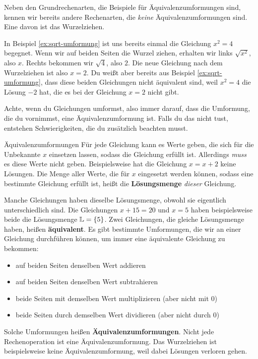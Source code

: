 \documentclass[../../main.tex]{subfiles}
\begin{document}
Neben den Grundrechenarten, die Beispiele für Äquivalenzumformungen sind, kennen wir bereits andere Rechenarten, die \emph{keine} Äquivalenzumformungen sind. Eine davon ist das Wurzelziehen.

\begin{example}{}
    In Beispiel \ref{ex:sqrt-umformung} ist uns bereits einmal die Gleichung $x^2=4$ begegnet. Wenn wir auf beiden Seiten die Wurzel ziehen, erhalten wir links $\sqrt{x^2}$, also $x$. Rechts bekommen wir $\sqrt{4}$, also $2$. Die neue Gleichung nach dem Wurzelziehen ist also $x=2$. Du weißt aber bereits aus Beispiel \ref{ex:sqrt-umformung}, dass diese beiden Gleichungen nicht äquivalent sind, weil $x^2=4$ die Lösung $-2$ hat, die es bei der Gleichung $x=2$ nicht gibt.
\end{example}

Achte, wenn du Gleichungen umformst, also immer darauf, dass die Umformung, die du vornimmst, eine Äquivalenzumformung ist. Falls du das nicht tust, entstehen Schwierigkeiten, die du zusätzlich beachten musst.

\begin{nutshell}{Äquivalenzumformungen}
    Für jede Gleichung kann es Werte geben, die sich für die Unbekannte $x$ einsetzen lassen, sodass die Gleichung erfüllt ist. Allerdings \emph{muss} es diese Werte nicht geben. Beispielsweise hat die Gleichung $x=x+2$ keine Lösungen. Die Menge aller Werte, die für $x$ eingesetzt werden können, sodass eine bestimmte Gleichung erfüllt ist, heißt die \textbf{Lösungsmenge} \Solutions \emph{dieser} Gleichung.
    
    Manche Gleichungen haben dieselbe Lösungsmenge, obwohl sie eigentlich unterschiedlich sind. Die Gleichungen $x+15=20$ und $x=5$ haben beispielsweise beide die Lösungsmenge $\mathbb{L}=\{5\}$. Zwei Gleichungen, die gleiche Lösungsmenge haben, heißen \textbf{äquivalent}. Es gibt bestimmte Umformungen, die wir an einer Gleichung durchführen können, um immer eine äquivalente Gleichung zu bekommen:
    \begin{itemize}
        \item auf beiden Seiten denselben Wert addieren
        \item auf beiden Seiten denselben Wert subtrahieren
        \item beide Seiten mit demselben Wert multiplizieren (aber nicht mit 0)
        \item beide Seiten durch demselben Wert dividieren (aber nicht durch 0)
    \end{itemize}
    Solche Umformungen heißen \textbf{Äquivalenzumformungen}. Nicht jede Rechenoperation ist eine Äquivalenzumformung. Das Wurzelziehen ist beispielsweise keine Äquivalenzumformung, weil dabei Lösungen verloren gehen.
\end{nutshell}
\end{document}
